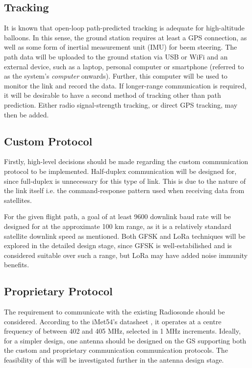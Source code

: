 \subsection{Tracking}
It is known that open-loop path-predicted tracking is adequate for high-altitude balloons. In this sense, the ground station requires at least a GPS connection, as well as some form of inertial measurement unit (IMU) for beem steering. The path data will be uploaded to the ground station via USB or WiFi and an external device, such as a laptop, personal computer or smartphone (referred to as the system's \textit{computer} onwards). Further, this computer will be used to monitor the link and record the data. If longer-range communication is required, it will be desirable to have a second method of tracking other than path prediction. Either radio signal-strength tracking, or direct GPS tracking, may then be added.

\subsection{Custom Protocol}
Firstly, high-level decisions should be made regarding the custom communication protocol to be implemented. Half-duplex communication will be designed for, since full-duplex is unnecessary for this type of link. This is due to the nature of the link itself i.e. the command-response pattern used when receiving data from satellites.

For the given flight path, a goal of at least 9600 downlink baud rate will be designed for at the approximate 100 km range, as it is a relatively standard satellite downlink speed as mentioned. Both GFSK and LoRa techniques will be explored in the detailed design stage, since GFSK is well-estabilished and is considered suitable over such a range, but LoRa may have added noise immunity benefits.

\subsection{Proprietary Protocol}
The requirement to communicate with the existing Radiosonde should be considered. According to the iMet54's datasheet \cite{datasheet-iMet54}, it operates at a centre frequency of between 402 and 405 MHz, selected in 1 MHz increments. Ideally, for a simpler design, one antenna should be designed on the GS supporting both the custom and proprietary communication communication protocols. The feasibility of this will be investigated further in the antenna design stage.

